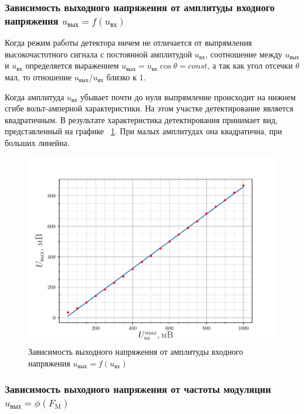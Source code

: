 \subsubsection{Зависимость выходного напряжения от амплитуды входного напряжения $u_\text{вых}=f(u_\text{вх})$}

Когда режим работы детектора ничем не отличается от выпрямления высокочастотного сигнала с постоянной амплитудой $u_\text{вх}$, соотношение между $u_\text{вых}$ и $u_\text{вх}$ определяется выражением $u_\text{вых}=u_\text{вх}\cos\theta=const$, а так как угол отсечки $\theta$ мал, то отношение $u_\text{вых}/u_\text{вх}$ близко к 1.

Когда амплитуда $u_\text{вх}$ убывает почти до нуля выпрямление происходит на нижнем сгибе вольт-амперной характеристики. На этом участке детектирование является квадратичным. В результате характеристика детектирования принимает вид, представленный на графике ~\ref{exp:3.2}. При малых амплитудах она квадратична, при больших линейна.  
\begin{figure}[H]
	\centering
	\includegraphics[width=\linewidth]{fig/exp3a.pdf}
	\caption{Зависимость выходного напряжения от амплитуды входного напряжения $u_\text{вых}=f(u_\text{вх})$}
	\label{exp:3.2}
\end{figure}


\subsubsection{Зависимость выходного напряжения от частоты модуляции  $u_{\text{вых}} = \phi(F_{\text{M}})$}

